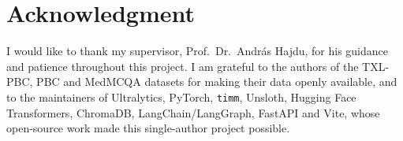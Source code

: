 \documentclass[12pt,a4paper]{article}
\newcommand{\code}[1]{\texttt{\small #1}}
\begin{document}










\clearpage
\setcounter{section}{8}


\clearpage
\section*{Acknowledgment}
I would like to thank my supervisor, Prof.\ Dr.\ András Hajdu, for his guidance and patience throughout this project. I am grateful to the authors of the TXL-PBC, PBC and MedMCQA datasets for making their data openly available, and to the maintainers of Ultralytics, PyTorch, \code{timm}, Unsloth, Hugging Face Transformers, ChromaDB, LangChain/LangGraph, FastAPI and Vite, whose open-source work made this single-author project possible.
\end{document}
